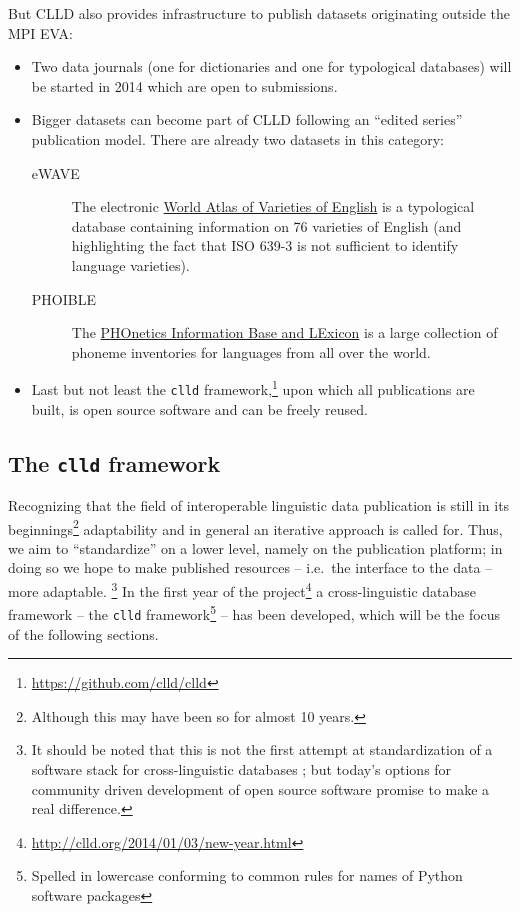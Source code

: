 \documentclass[a4paper,10pt]{article}
\begin{document}
But CLLD also provides infrastructure to publish datasets originating outside the MPI EVA:
\begin{itemize}
\item Two data journals (one for dictionaries and one for typological databases) will be started in 2014 which are open to submissions.
\item Bigger datasets can become part of CLLD following an ``edited series'' publication model. There are already two datasets in this category:
\begin{description}
\item[eWAVE] The electronic \href{http://ewave-atlas.org/}{World Atlas of Varieties of English} is a typological database containing information on 76 varieties of English (and highlighting the fact that ISO 639-3 is not sufficient to identify language varieties).
\item[PHOIBLE] The \href{http://phoible.org}{PHOnetics Information Base and LExicon} is a large collection of phoneme inventories for languages from all over the world.
\end{description}
\item Last but not least the \texttt{clld} framework,\footnote{\url{https://github.com/clld/clld}} upon which all publications are built, is open source software and can be freely reused.
\end{itemize}

\subsection{The \texttt{clld} framework}
Recognizing that the field of interoperable linguistic data publication is still in its beginnings\footnote{Although this may have been so for almost 10 years.} adaptability and in general an iterative approach is called for. Thus, we aim to ``standardize'' on a lower level, namely 
on the publication platform; in doing so we hope to make published resources -- i.e.~the interface to the data -- more adaptable.%
\footnote{It should be noted that this is not the first attempt at standardization of a software stack for cross-linguistic databases \cite{dimitriadis2002}; but today's options for community driven development of open source software promise to make a real difference.}
In the first year of the project\footnote{\url{http://clld.org/2014/01/03/new-year.html}} a cross-linguistic database framework -- the \texttt{clld} framework\footnote{Spelled in lowercase conforming to common rules for names of Python software packages} -- has been developed, which will be the focus of the following sections. 
\end{document}
